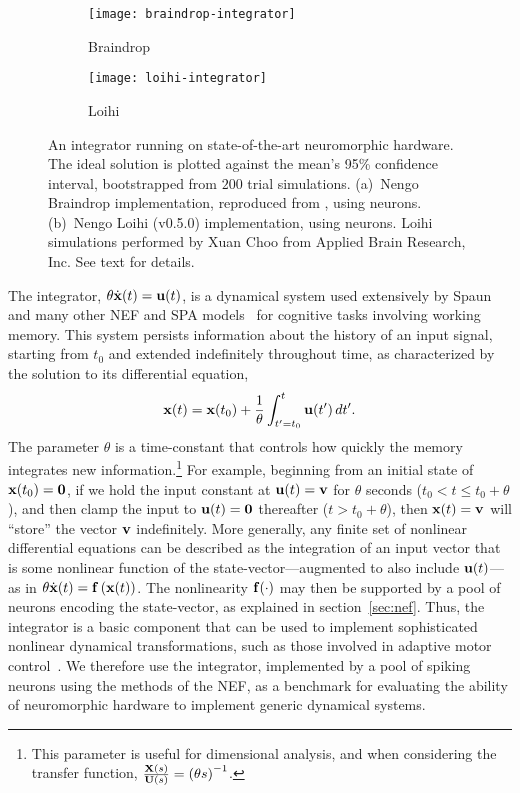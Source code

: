 \begin{figure}
  \centering
  \begin{subfigure}{.5\textwidth}
    \centering
    \texttt{[image: braindrop-integrator]}
    \caption{Braindrop}
    \label{fig:braindrop-integrator}
  \end{subfigure}%
  \begin{subfigure}{.5\textwidth}
    \centering
    \texttt{[image: loihi-integrator]}
    \caption{Loihi}
    \label{fig:loihi-integrator}
  \end{subfigure}
  \caption[Dynamical integration on Braindrop and Loihi.]{
    An integrator running on state-of-the-art neuromorphic hardware.
    The ideal solution is plotted against the mean's 95\% confidence interval, bootstrapped from $200$ trial simulations.
    (a)~Nengo Braindrop implementation, reproduced from \citet[][Figure~15]{braindrop2019}, using  neurons. 
    (b)~Nengo Loihi (v0.5.0) implementation, using  neurons.
    Loihi simulations performed by Xuan Choo from Applied Brain Research, Inc.
    See text for details.
  }\label{fig:integrator-neuromorphic}
\end{figure}

The integrator, $\theta \dot{\mathbf{x}}(t) = \mathbf{u}(t)$, is a dynamical system used extensively by Spaun~\citep{eliasmith2012} and many other NEF and SPA models~\citep[][to name a few]{singh2004, trujillo2014a, rasmussen2017} for cognitive tasks involving working memory.
This system persists information about the history of an input signal, starting from $t_0$ and extended indefinitely throughout time, as characterized by the solution to its differential equation,
$$\mathbf{x}(t) = \mathbf{x}(t_0) + \frac{1}{\theta} \int_{t'=t_0}^{t} \mathbf{u}(t')\, dt' \text{.}$$
The parameter $\theta$ is a time-constant that controls how quickly the memory integrates new information.\footnote{
This parameter is useful for dimensional analysis, and when considering the transfer function, $\frac{\mathbf{X}(s)}{\mathbf{U}(s)} = \left( \theta s \right)^{-1}$.}
For example, beginning from an initial state of $\mathbf{x}(t_0) = \mathbf{0}$, if we hold the input constant at $\mathbf{u}(t) = \mathbf{v}$ for $\theta$ seconds ($t_0 < t \le t_0 + \theta$), and then clamp the input to $\mathbf{u}(t) = \mathbf{0}$ thereafter ($t > t_0 + \theta$), then $\mathbf{x}(t) = \mathbf{v}$ will ``store'' the vector $\mathbf{v}$ indefinitely.
More generally, any finite set of nonlinear differential equations can be described as the integration of an input vector that is some nonlinear function of the state-vector---augmented to also include $\mathbf{u}(t)$---as in $\theta \dot{\mathbf{x}}(t) = \mathbf{f}\left({\mathbf{x}(t)}\right)$.
The nonlinearity $\mathbf{f}(\cdot)$ may then be supported by a pool of neurons encoding the state-vector, as explained in section~\ref{sec:nef}.
Thus, the integrator is a basic component that can be used to implement sophisticated nonlinear dynamical transformations, such as those involved in adaptive motor control~\citep{dewolf2016}.
We therefore use the integrator, implemented by a pool of spiking neurons using the methods of the NEF, as a benchmark for evaluating the ability of neuromorphic hardware to implement generic dynamical systems.

